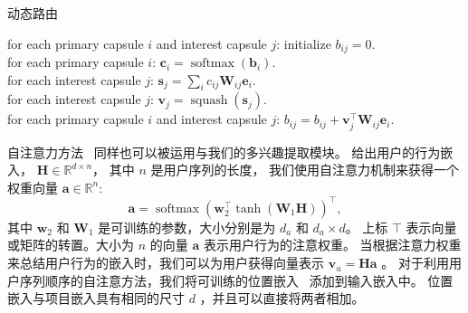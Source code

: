 

\begin{algorithm}[t]
	\caption{动态路由 \label{algo:dynamic_routing}}
	for each primary capsule $i$ and interest capsule $j$: initialize $b_{ij} = 0$. \\
     {
        for each primary capsule $i$: $\mathbf{c}_i = \operatorname{softmax}(\mathbf{b}_{i})$.\\
        for each interest capsule $j$: $\mathbf{s}_j = \sum_{i} c_{ij}\mathbf{W}_{ij}\mathbf{e}_i$.\\%

        for each interest capsule $j$: $\mathbf{v}_j = \operatorname{squash}(\mathbf{s}_j)$. \\

        for each primary capsule $i$ and interest capsule $j$: $b_{ij} = b_{ij}+ \mathbf{v}_j^\top \mathbf{W}_{ij}\mathbf{e}_i$.
    }
\end{algorithm}


自注意力方法~\cite{lin2017structured} 同样也可以被运用与我们的多兴趣提取模块。
给出用户的行为嵌入， $\mathbf{H}\in \mathbb{R}^{d\times n}$， 其中 $n$ 是用户序列的长度， 我们使用自注意力机制来获得一个权重向量 $\mathbf{a} \in \mathbb{R}^{n}$:
\begin{equation}
    \mathbf{a} = \operatorname{softmax}(\mathbf{w}_{2}^\top \operatorname{tanh}(\mathbf{W}_{1} \mathbf{H}))^\top,
\end{equation}
\noindent 其中 $\mathbf{w}_{2}$ 和 $\mathbf{W}_{1}$ 是可训练的参数，大小分别是为 $d_a$ 和 $d_a \times d$。 上标 $\top$ 表示向量或矩阵的转置。大小为 $n$ 的向量 $\mathbf{a}$ 表示用户行为的注意权重。 当根据注意力权重来总结用户行为的嵌入时，我们可以为用户获得向量表示 $\mathbf{v}_u = \mathbf{H} \mathbf{a}$ 。 对于利用用户序列顺序的自注意方法，我们将可训练的位置嵌入~\cite{vaswani2017attention} 添加到输入嵌入中。 位置嵌入与项目嵌入具有相同的尺寸 $d$ ，并且可以直接将两者相加。

